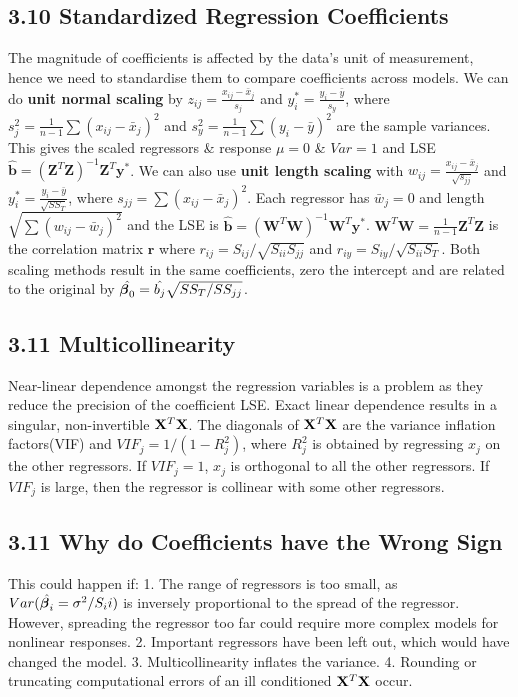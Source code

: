 \begin{multicols*}{3}
\subsection{3.10 Standardized Regression Coefficients}
The magnitude of coefficients is affected by the data's unit of measurement, hence we need to standardise them to compare coefficients across models. We can do \textbf{unit normal scaling} by $z_{ij} = \frac{x_{ij}-\bar{x}_j}{s_j}$ and $y_i^* = \frac{y_i-\bar{y}}{s_y}$, where $s_j^2 = \frac{1}{n-1}\sum(x_{ij}-\bar{x}_j)^2$
and $s_y^2 = \frac{1}{n-1}\sum(y_i-\bar{y})^2$ are the sample variances. This gives the scaled regressors \& response $\mu = 0$ \& $Var = 1$ and LSE $\hat{\mathbf{b}} = (\mathbf{Z}^T\mathbf{Z})^{-1}\mathbf{Z}^T\mathbf{y}^*$. We can also use \textbf{unit length scaling} with $w_{ij} = \frac{x_{ij}-\bar{x}_j}{\sqrt{s_{jj}}}$ and $y_i^* = \frac{y_i-\bar{y}}{\sqrt{SS_T}}$, where $s_{jj} = \sum(x_{ij}-\bar{x}_j)^2$. Each regressor has $\bar{w}_j = 0$ and length $\sqrt{\sum(w_{ij} - \bar{w}_j)^2}$ and the LSE is $\hat{\mathbf{b}} = (\mathbf{W}^T\mathbf{W})^{-1}\mathbf{W}^T\mathbf{y}^*$. $\mathbf{W}^T\mathbf{W} = \frac{1}{n-1}\mathbf{Z}^T\mathbf{Z}$ is the correlation matrix $\mathbf{r}$ where $r_{ij} = S_{ij}/\sqrt{S_{ii}S_{jj}}$ and $r_{iy} = S_{iy}/\sqrt{S_{ii}S_T}$. Both scaling methods result in the same coefficients, zero the intercept and are related to the original by $\hat{\boldsymbol{\beta}_0} = \hat{b_j}\sqrt{SS_T/SS_{jj}}$.

\subsection{3.11 Multicollinearity}
Near-linear dependence amongst the regression variables is a problem as they reduce the precision of the coefficient LSE. Exact linear dependence results in a singular, non-invertible $\mathbf{X}^T\mathbf{X}$. The diagonals of $\mathbf{X}^T\mathbf{X}$ are the variance inflation factors(VIF) and $VIF_j = 1/(1-R_j^2)$, where $R_j^2$ is obtained by regressing $x_j$ on the other regressors. If $VIF_j = 1$, $x_j$ is orthogonal to all the other regressors. If $VIF_j$ is large, then the regressor is collinear with some other regressors.

\subsection{3.11 Why do Coefficients have the Wrong Sign}
This could happen if: 1. The range of regressors is too small, as $Var(\hat{\boldsymbol{\beta}_i} = \sigma^2/S_ii)$ is inversely proportional to the spread of the regressor. However, spreading the regressor too far could require more complex models for nonlinear responses. 2. Important regressors have been left out, which would have changed the model. 3. Multicollinearity inflates the variance. 4. Rounding or truncating computational errors of an ill conditioned $\mathbf{X}^T\mathbf{X}$ occur.



\end{multicols*}